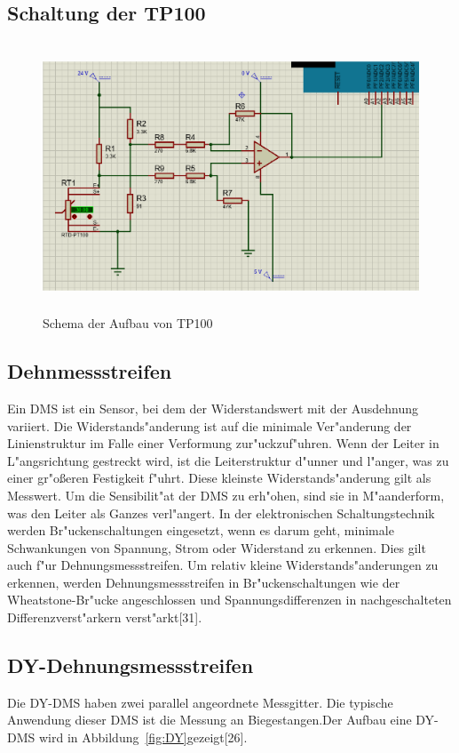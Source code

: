 \subsection{Schaltung der TP100}
\begin{figure}[!htb]
\begin{center}
\includegraphics[height=8cm]{bilder/im.eps}
\end{center}
\caption{Schema der Aufbau von TP100}
\end{figure}

\subsection{Dehnmessstreifen}
Ein DMS ist ein Sensor, 
bei dem der Widerstandswert mit der Ausdehnung variiert.
 Die Widerstands"anderung ist auf die minimale Ver"anderung 
 der Linienstruktur im Falle einer Verformung zur"uckzuf"uhren. 
 Wenn der Leiter in L"angsrichtung gestreckt wird, 
 ist die Leiterstruktur d"unner und l"anger, 
 was zu einer gr"oßeren Festigkeit f"uhrt. 
 Diese kleinste Widerstands"anderung gilt als Messwert. 
 Um die Sensibilit"at der DMS zu erh"ohen, 
 sind sie in M"aanderform, was den Leiter als Ganzes verl"angert. 
 In der elektronischen Schaltungstechnik werden Br"uckenschaltungen eingesetzt,
  wenn es darum geht, 
  minimale Schwankungen von Spannung, 
  Strom oder Widerstand zu erkennen. 
  Dies gilt auch f"ur Dehnungsmessstreifen. Um relativ kleine 
  Widerstands"anderungen zu erkennen, werden Dehnungsmessstreifen 
  in Br"uckenschaltungen wie der Wheatstone-Br"ucke angeschlossen und 
  Spannungsdifferenzen in nachgeschalteten Differenzverst"arkern verst"arkt[31].
  
\subsection{DY-Dehnungsmessstreifen}
Die DY-DMS haben zwei parallel angeordnete Messgitter. 
Die typische Anwendung dieser DMS ist die Messung an Biegestangen.Der Aufbau 
eine DY-DMS wird in Abbildung~\ref{fig:DY}gezeigt[26]. 



